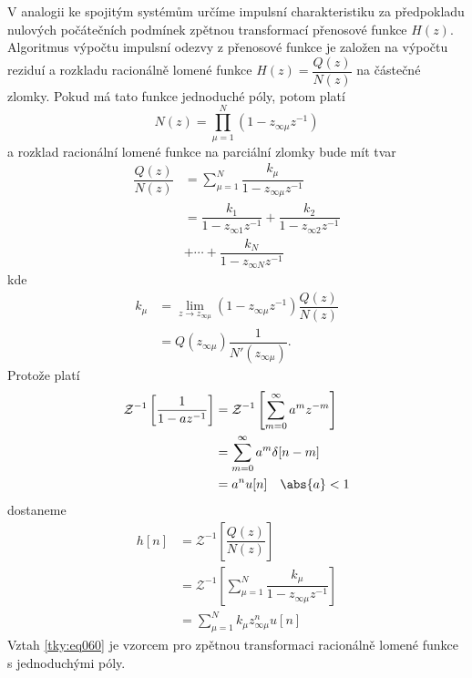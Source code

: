       V analogii ke spojitým systémům určíme impulsní charakteristiku za předpokladu nulových
      počátečních podmínek zpětnou transformací přenosové funkce \(H(z)\). Algoritmus výpočtu
      impulsní odezvy z přenosové funkce je založen na výpočtu reziduí a rozkladu racionálně lomené
      funkce \(H(z) = \dfrac{Q(z)}{N(z)}\) na částečné zlomky. Pokud má tato funkce jednoduché póly,
      potom platí
      \begin{equation}\label{tky:eq056}
        N(z) = \prod_{\mu=1}^N\left(1 - z_{\infty\mu}z^{-1}\right)
      \end{equation}
      a rozklad racionální lomené funkce na parciální zlomky bude mít tvar
      \begin{align}
        \dfrac{Q(z)}{N(z)} 
          &= \sum_{\mu=1}^N\dfrac{k_\mu}{1 - z_{\infty\mu}z^{-1}}                    \nonumber \\
          &= \dfrac{k_1}{1 - z_{\infty1}z^{-1}} + \dfrac{k_2}{1 - z_{\infty2}z^{-1}} \nonumber \\
          &+ \cdots + \dfrac{k_N}{1 - z_{\infty N}z^{-1}}                          \label{tky:eq057}
      \end{align} 
      kde
      \begin{align}
        k_\mu &= \lim_{z\rightarrow z_{\infty\mu}}
                 \left(1 - z_{\infty\mu}z^{-1}\right)\dfrac{Q(z)}{N(z)}    \nonumber \\
              &= Q(z_{\infty\mu})\dfrac{1}{N'(z_{\infty\mu})}.             \label{tky:eq058}
      \end{align}
      Protože platí
      \begin{align}
        \mathcal{Z}^{-1}\left[\dfrac{1}{1-az^{-1}}\right]  
          &= \mathcal{Z}^{-1}\left[\sum_{m=0}^\infty a^mz^{-m}\right]     \nonumber \\
          &= \sum_{m=0}^\infty a^m\delta[n-m]                             \nonumber \\
          &= a^nu[n] \quad \abs{a}<1                                      \label{tky:eq059}
      \end{align}
      dostaneme
      \begin{align}
        h[n] &= \mathcal{Z}^{-1}\left[\dfrac{Q(z)}{N(z)}\right]                 \nonumber \\
             &= \mathcal{Z}^{-1}
                \left[\sum_{\mu=1}^N\dfrac{k_\mu}{1-z_{\infty\mu}z^{-1}}\right] \nonumber \\
             &= \sum_{\mu=1}^Nk_\mu z^n_{\infty\mu}u[n]                         \label{tky:eq060}
      \end{align}
      Vztah \ref{tky:eq060} je vzorcem pro zpětnou transformaci racionálně lomené funkce s
      jednoduchými póly.
      
